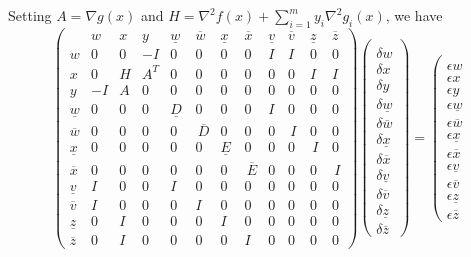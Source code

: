\documentclass[11pt,a4paper]{article}
\newcommand{\unl}[1]{{\ \!\underline{\;\!\!#1\;\!\!}\ \!}}
\renewcommand{\unl}[1]{{\underline{#1}}}
\newcommand{\ovl}[1]{{\bar{#1}}}
\renewcommand{\ovl}[1]{{\overline{#1}}}
\newcommand{\vl}{{\unl{v}}}
\newcommand{\wl}{{\unl{w}}}
\newcommand{\xl}{{\unl{x}}}
\newcommand{\zl}{{\unl{z}}}
\newcommand{\Dl}{{\underline{D\!}\,}}
\newcommand{\El}{{\underline{E\!}\,}}
\newcommand{\vu}{{\ovl{v}}}
\newcommand{\wu}{{\ovl{w}}}
\newcommand{\xu}{{\ovl{x}}}
\newcommand{\zu}{{\ovl{z}}}
\newcommand{\Du}{{\,\overline{\!D}}}
\newcommand{\Eu}{{\,\overline{\!E}}}
\newcommand{\w}{w}
\newcommand{\x}{x}
\newcommand{\y}{y}
\begin{document}
Setting $A=\nabla\!g(x)$ and $H=\nabla^2\!f(x)+\sum_{i=1}^{m} y_i \nabla^2 g_i(x)$, we have
{\small\begin{equation*}
\left( \begin{array}{c|ccc|cccc|cccc}
    & \w&\x&\y & \wl&\wu&\xl&\xu & \vl&\vu&\zl&\zu \\ \hline
  \w & 0 & 0 & -I  &  0&0&0&0 & I&I&0&0 \\
  \x & 0 & H & A^T  &  0&0&0&0 & 0&0&I&I \\
  \y & -I & A & 0  &  0&0&0&0 & 0&0&0&0 \\ \hline
  \wl & 0 & 0 & 0  &  \!\Dl\!\!\!&0&0&0 & I\,&0&0&0 \\
  \wu & 0 & 0 & 0  &  0&\!\!\!\Du\!\!\!&0&0 & 0&\,I\,&0&0 \\
  \xl & 0 & 0 & 0  &  0&0&\!\!\!\El\!\!\!&0 & 0&0&\,I\,&0 \\
  \xu & 0 & 0 & 0  &  0&0&0&\!\!\!\Eu\! & 0&0&0&\,I \\ \hline
  \vl & I & 0 & 0  &  I&0&0&0 & 0&0&0&0 \\
  \vu & I & 0 & 0  &  0&I&0&0 & 0&0&0&0 \\
  \zl & 0 & I & 0  &  0&0&I&0 & 0&0&0&0 \\
  \zu & 0 & I & 0  &  0&0&0&I & 0&0&0&0
\end{array}\right)
\left( \begin{array}{c}
  \\\hline \delta\w\\\delta\x\\\delta\y \\\hline \delta\wl\\\delta\wu\\\delta\xl\\\delta\xu \\\hline \delta\vl\\\delta\vu\\\delta\zl\\\delta\zu
\end{array}\right)
=
\left( \begin{array}{c}
  \\\hline \epsilon\w\\\epsilon\x\\\epsilon\y \\\hline \epsilon\wl\\\epsilon\wu\\\epsilon\xl\\\epsilon\xu \\\hline \epsilon\vl\\\epsilon\vu\\\epsilon\zl\\\epsilon\zu

\end{array}
\end{equation*}}
\end{document}

